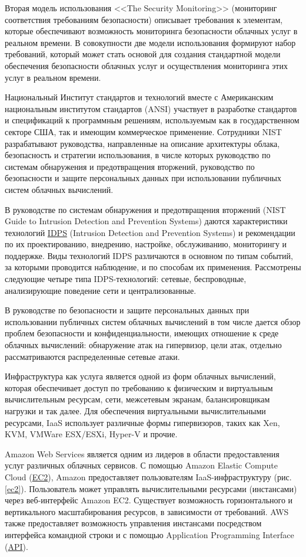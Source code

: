 Вторая модель использования <<The Security Monitoring>> (мониторинг соответствия требованиям безопасности) описывает требования к элементам, которые обеспечивают возможность мониторинга безопасности облачных услуг в реальном времени.
В совокупности две модели использования формируют набор требований, который может стать основой для создания стандартной модели обеспечения безопасности облачных услуг и осуществления мониторинга этих услуг в реальном времени.

Национальный Институт стандартов и технологий вместе с Американским национальным институтом стандартов (ANSI) участвует в разработке стандартов и спецификаций к программным решениям, используемым как в государственном секторе США, так и имеющим коммерческое применение.
Сотрудники NIST разрабатывают руководства, направленные на описание архитектуры облака, безопасность и стратегии использования, в числе которых руководство по системам обнаружения и предотвращения вторжений, руководство по безопасности и защите персональных данных при использовании публичных систем облачных вычислений.

В руководстве по системам обнаружения и предотвращения вторжений (NIST Guide to Intrusion Detection and Prevention Systems) даются характеристики технологий \hyperlink{idps}{IDPS} (Intrusion Detection and Prevention Systems) и рекомендации по их проектированию, внедрению, настройке, обслуживанию, мониторингу и поддержке.
Виды технологий IDPS различаются в основном по типам событий, за которыми проводится наблюдение, и по способам их применения.
Рассмотрены следующие четыре типа IDPS-технологий: сетевые, беспроводные, анализирующие поведение сети и централизованные.

В руководстве по безопасности и защите персональных данных при использовании публичных систем облачных вычислений в том числе дается обзор проблем безопасности и конфиденциальности, имеющих отношение к среде облачных вычислений: обнаружение атак на гипервизор, цели атак, отдельно рассматриваются распределенные сетевые атаки.

Инфраструктура как услуга является одной из форм облачных вычислений, которая обеспечивает доступ по требованию к физическим и виртуальным вычислительным ресурсам, сети, межсетевым экранам, балансировщикам нагрузки и так далее.
Для обеспечения виртуальными вычислительными ресурсами, IaaS использует различные формы гипервизоров, таких как Xen, KVM, VMWare ESX/ESXi, Hyper-V и прочие.

Amazon Web Services является одним из лидеров в области предоставления услуг различных облачных сервисов.
С помощью Amazon Elastic Compute Cloud (\hyperlink{ec2}{EC2}), Amazon предоставляет пользователям IaaS-инфраструктуру (рис. \ref{ec2}).
Пользователь может управлять вычислительными ресурсами (инстансами) через веб-интерфейс Amazon EC2.
Существует возможность горизонтального и вертикального масштабирования ресурсов, в зависимости от требований.
AWS также предоставляет возможность управления инстансами посредством интерфейса командной строки и с помощью Application Programming Interface (\hyperlink{api}{API}).

